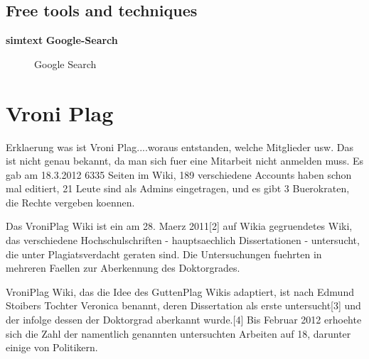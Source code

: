 \newpage
\subsection{Free tools and techniques}

	\textbf{simtext}
	\textbf{Google-Search}

	 \begin{figure}[!h]
  \centering
  \caption{Google Search}
  \label{fig:Google Search}
\end{figure}






\newpage


\section{Vroni Plag}
Erklaerung was ist Vroni Plag....woraus entstanden, welche Mitglieder usw.
Das ist nicht genau bekannt, da man sich fuer eine Mitarbeit nicht anmelden muss. Es gab am 18.3.2012 6335 Seiten im Wiki, 189 verschiedene Accounts haben schon mal editiert, 21 Leute sind als Admins eingetragen, und es gibt 3 Buerokraten, die Rechte vergeben koennen. 

Das VroniPlag Wiki ist ein am 28. Maerz 2011[2] auf Wikia gegruendetes Wiki, das verschiedene Hochschulschriften - hauptsaechlich Dissertationen - untersucht, die unter Plagiatsverdacht geraten sind. Die Untersuchungen fuehrten in mehreren Faellen zur Aberkennung des Doktorgrades.

VroniPlag Wiki, das die Idee des GuttenPlag Wikis adaptiert, ist nach Edmund Stoibers Tochter Veronica benannt, deren Dissertation als erste untersucht[3] und der infolge dessen der Doktorgrad aberkannt wurde.[4] Bis Februar 2012 erhoehte sich die Zahl der namentlich genannten untersuchten Arbeiten auf 18, darunter einige von Politikern.

